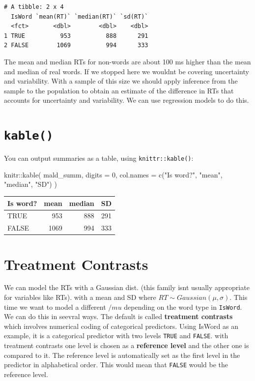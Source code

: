 \documentclass[
  letterpaper,
  DIV=11,
  numbers=noendperiod]{scrartcl}
\newenvironment{Shaded}{\begin{snugshade}}{\end{snugshade}}
\newcommand{\AttributeTok}[1]{\textcolor[rgb]{0.40,0.45,0.13}{#1}}
\newcommand{\DecValTok}[1]{\textcolor[rgb]{0.68,0.00,0.00}{#1}}
\newcommand{\FunctionTok}[1]{\textcolor[rgb]{0.28,0.35,0.67}{#1}}
\newcommand{\NormalTok}[1]{\textcolor[rgb]{0.00,0.23,0.31}{#1}}
\newcommand{\SpecialCharTok}[1]{\textcolor[rgb]{0.37,0.37,0.37}{#1}}
\newcommand{\StringTok}[1]{\textcolor[rgb]{0.13,0.47,0.30}{#1}}
\newcounter{none} %
\begin{document}
\begin{verbatim}
# A tibble: 2 x 4
  IsWord `mean(RT)` `median(RT)` `sd(RT)`
  <fct>       <dbl>        <dbl>    <dbl>
1 TRUE          953          888      291
2 FALSE        1069          994      333
\end{verbatim}

The mean and median RTs for non-words are about 100 ms higher than the
mean and median of real words. If we stopped here we wouldnt be covering
uncertainty and variability. With a sample of this size we should apply
inference from the sample to the population to obtain an estimate of the
difference in RTs that accounts for uncertainty and variability. We can
use regression models to do this.

\section{\texorpdfstring{\texttt{kable()}}{kable()}}\label{kable}

You can output summaries as a table, using \texttt{knittr::kable()}:

\begin{Shaded}
\begin{Highlighting}[]
\NormalTok{knitr}\SpecialCharTok{::}\FunctionTok{kable}\NormalTok{(}
\NormalTok{  mald\_summ,}
  \AttributeTok{digits =} \DecValTok{0}\NormalTok{, }\AttributeTok{col.names =} \FunctionTok{c}\NormalTok{(}\StringTok{"Is word?"}\NormalTok{, }\StringTok{"mean"}\NormalTok{, }\StringTok{"median"}\NormalTok{, }\StringTok{"SD"}\NormalTok{) }
\NormalTok{)}
\end{Highlighting}
\end{Shaded}

{\def\LTcaptype{none} %
\begin{longtable}[]{@{}lrrr@{}}
\toprule\noalign{}
Is word? & mean & median & SD \\
\midrule\noalign{}
\endhead
\bottomrule\noalign{}
\endlastfoot
TRUE & 953 & 888 & 291 \\
FALSE & 1069 & 994 & 333 \\
\end{longtable}
}

\section{Treatment Contrasts}\label{treatment-contrasts}

We can model the RTs with a Gaussian dist. (this family isnt usually
appropriate for variables like RTs). with a mean and SD where
\(RT∼Gaussian(\mu,\sigma)\). This time we want to model a different
\(/mu\) depending on the word type in \texttt{IsWord}. We can do this in
seevral ways. The default is called \textbf{treatment contrasts} which
involves numerical coding of categorical predictors. Using IsWord as an
example, it is a categorical predictor with two levels \texttt{TRUE} and
\texttt{FALSE}. with treatment contrasts one level is chosen as a
\textbf{reference level} and the other one is compared to it. The
reference level is automatically set as the first level in the predictor
in alphabetical order. This would mean that \texttt{FALSE} would be the
reference level.
\end{document}
